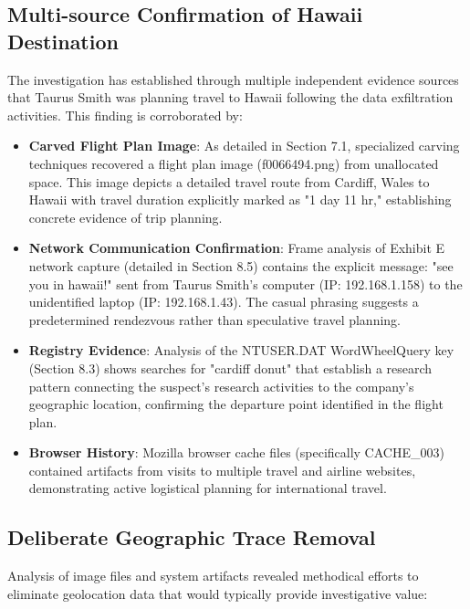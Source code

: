 \subsection{Multi-source Confirmation of Hawaii Destination}
The investigation has established through multiple independent evidence sources that Taurus Smith was planning travel to Hawaii following the data exfiltration activities. This finding is corroborated by:

\begin{itemize}
    \item \textbf{Carved Flight Plan Image}: As detailed in Section 7.1, specialized carving techniques recovered a flight plan image (f0066494.png) from unallocated space. This image depicts a detailed travel route from Cardiff, Wales to Hawaii with travel duration explicitly marked as "1 day 11 hr," establishing concrete evidence of trip planning.
    
    \item \textbf{Network Communication Confirmation}: Frame analysis of Exhibit E network capture (detailed in Section 8.5) contains the explicit message: "see you in hawaii!" sent from Taurus Smith's computer (IP: 192.168.1.158) to the unidentified laptop (IP: 192.168.1.43). The casual phrasing suggests a predetermined rendezvous rather than speculative travel planning.
    
    \item \textbf{Registry Evidence}: Analysis of the NTUSER.DAT WordWheelQuery key (Section 8.3) shows searches for "cardiff donut" that establish a research pattern connecting the suspect's research activities to the company's geographic location, confirming the departure point identified in the flight plan.
    
    \item \textbf{Browser History}: Mozilla browser cache files (specifically CACHE\_003) contained artifacts from visits to multiple travel and airline websites, demonstrating active logistical planning for international travel.
\end{itemize}

\subsection{Deliberate Geographic Trace Removal}
Analysis of image files and system artifacts revealed methodical efforts to eliminate geolocation data that would typically provide investigative value:

